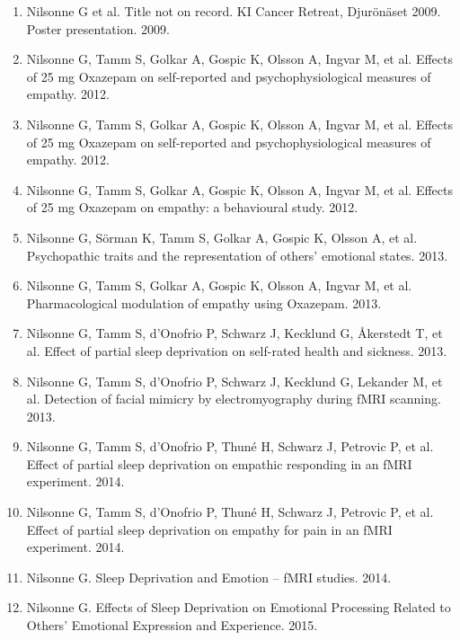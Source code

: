 \documentclass[10pt,a4paper,twocolumn]{article}
\begin{document}
\begin{enumerate}
    \item Nilsonne G et al. Title not on record. KI Cancer Retreat, Djurönäset 2009. Poster presentation. 2009.

    \item Nilsonne G, Tamm S, Golkar A, Gospic K, Olsson A, Ingvar M, et al. Effects of 25 mg Oxazepam on self-reported and psychophysiological measures of empathy. 2012.

    \item Nilsonne G, Tamm S, Golkar A, Gospic K, Olsson A, Ingvar M, et al. Effects of 25 mg Oxazepam on self-reported and psychophysiological measures of empathy. 2012.

    \item Nilsonne G, Tamm S, Golkar A, Gospic K, Olsson A, Ingvar M, et al. Effects of 25 mg Oxazepam on empathy: a behavioural study. 2012.

    \item Nilsonne G, Sörman K, Tamm S, Golkar A, Gospic K, Olsson A, et al. Psychopathic traits and the representation of others’ emotional states. 2013.

    \item Nilsonne G, Tamm S, Golkar A, Gospic K, Olsson A, Ingvar M, et al. Pharmacological modulation of empathy using Oxazepam. 2013.

    \item Nilsonne G, Tamm S, d’Onofrio P, Schwarz J, Kecklund G, Åkerstedt T, et al. Effect of partial sleep deprivation on self-rated health and sickness. 2013.

    \item Nilsonne G, Tamm S, d’Onofrio P, Schwarz J, Kecklund G, Lekander M, et al. Detection of facial mimicry by electromyography during fMRI scanning. 2013.

    \item Nilsonne G, Tamm S, d’Onofrio P, Thuné H, Schwarz J, Petrovic P, et al. Effect of partial sleep deprivation on empathic responding in an fMRI experiment. 2014.

    \item Nilsonne G, Tamm S, d’Onofrio P, Thuné H, Schwarz J, Petrovic P, et al. Effect of partial sleep deprivation on empathy for pain in an fMRI experiment. 2014.

    \item Nilsonne G. Sleep Deprivation and Emotion – fMRI studies. 2014.

    \item Nilsonne G. Effects of Sleep Deprivation on Emotional Processing Related to Others’ Emotional Expression and Experience. 2015.


\end{enumerate}
\end{document}
